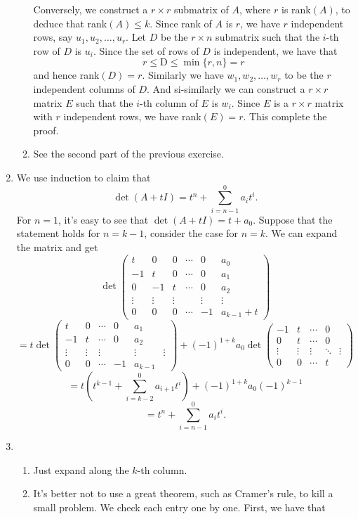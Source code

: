 \begin{enumerate}
\begin{enumerate}
Conversely, we construct a $r\times r$ submatrix of $A$, where $r$ is rank$(A)$, to deduce that rank$(A)\leq k$. Since rank of $A$ is $r$, we have $r$ independent rows, say $u_1,u_2,\ldots ,u_r$. Let $D$ be the $r\times n$ submatrix such that the $i$-th row of $D$ is $u_i$. Since the set of rows of $D$ is independent, we have that 
\[r\leq \mathrm{D}\leq \min\{r,n\}=r\]
and hence rank$(D)=r$. Similarly we have $w_1,w_2,\ldots ,w_r$ to be the $r$ independent columns of $D$. And si-similarly we can construct a $r\times r$ matrix $E$ such that the $i$-th column of $E$ is $w_i$. Since $E$ is a $r\times r$ matrix with $r$ independent rows, we have rank$(E)=r$. This complete the proof.
\item See the second part of the previous exercise.
\end{enumerate}
\item We use induction to claim that 
\[\det(A+tI)=t^n+\sum_{i=n-1}^{0}{a_it^i}.\]
For $n=1$, it's easy to see that $\det(A+tI)=t+a_0$. Suppose that the statement holds for $n=k-1$, consider the case for $n=k$. We can expand the matrix and get 
\[\det\begin{pmatrix}t&0&0&\cdots &0&a_0\\-1&t&0&\cdots &0&a_1\\0&-1&t&\cdots &0&a_2\\\vdots &\vdots &\vdots & &\vdots &\vdots \\0&0&0&\cdots &-1&a_{k-1}+t\end{pmatrix} \]
\[=t\det\begin{pmatrix}t&0&\cdots &0&a_1\\-1&t&\cdots &0&a_2\\\vdots &\vdots &\vdots & &\vdots &\vdots \\0&0&\cdots &-1&a_{k-1}\end{pmatrix}+(-1)^{1+k}a_0\det\begin{pmatrix}-1&t&\cdots &0\\0&t&\cdots &0\\\vdots &\vdots &\vdots &\ddots &\vdots \\0&0&\cdots &t\end{pmatrix}\]
\[=t(t^{k-1}+\sum_{i=k-2}^{0}{a_{i+1}t^i})+(-1)^{1+k}a_0(-1)^{k-1}\]
\[=t^n+\sum_{i=n-1}^{0}{a_it^i}.\]
\item \begin{enumerate}
\item Just expand along the $k$-th column.
\item It's better not to use a great theorem, such as Cramer's rule, to kill a small problem. We check each entry one by one. First, we have that 

\end{enumerate}
\end{enumerate}
